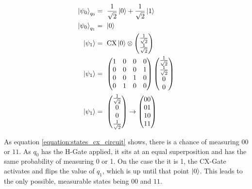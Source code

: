 \begin{equation}
    \centering
    \begin{split}
    \ket{\psi_0}_{q_0} &=\ \frac{1}{\sqrt{2}}\ket{0} + \frac{1}{\sqrt{2}}\ket{1}\\
    \ket{\psi_0}_{q_1} &=\ \ket{0}\\
    \ket{\psi_1} &=\ \mathrm{CX}\ket{0}\otimes\begin{pmatrix}\frac{1}{\sqrt{2}} \\ \frac{1}{\sqrt{2}}\end{pmatrix} \\
    \ket{\psi_1} &=\ \begin{pmatrix}
    1 & 0 & 0 & 0\\
    0 & 0 & 0 & 1\\
    0 & 0 & 1 & 0\\
    0 & 1 & 0 & 0\\
    \end{pmatrix}\begin{pmatrix}\frac{1}{\sqrt{2}} \\ \frac{1}{\sqrt{2}} \\ 0 \\ 0\end{pmatrix} \\
    \ket{\psi_1} &=\ \begin{pmatrix}\frac{1}{\sqrt{2}} \\ 0 \\ 0 \\ \frac{1}{\sqrt{2}}\end{pmatrix} \rightarrow \begin{pmatrix}00 \\ 01 \\ 10 \\ 11\end{pmatrix}
    \end{split}
    \label{equation:states_cx_circuit}
\end{equation}

As equation \ref{equation:states_cx_circuit} shows, there is a chance of measuring $00$ or $11$. As $q_0$ has the H-Gate applied, it sits at an equal superposition and has the same probability of measuring 0 or 1. On the case the it is 1, the CX-Gate activates and flips the value of $q_1$, which is up until that point $\ket{0}$. This leads to the only possible, measurable states being $00$ and $11$.



\newpage

